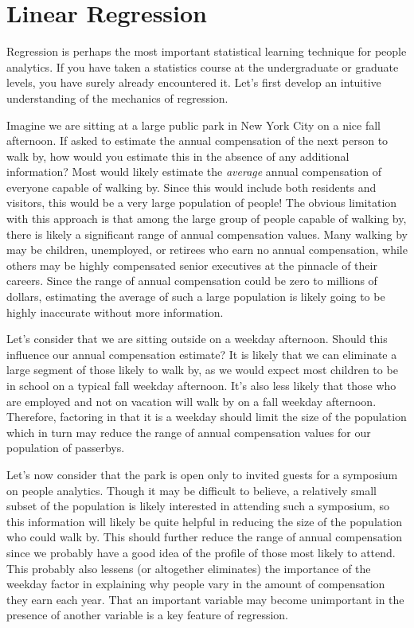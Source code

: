 \documentclass[
]{book}
\begin{document}
\hypertarget{lm}{%
\chapter{Linear Regression}\label{lm}}

Regression is perhaps the most important statistical learning technique for people analytics. If you have taken a statistics course at the undergraduate or graduate levels, you have surely already encountered it. Let's first develop an intuitive understanding of the mechanics of regression.

Imagine we are sitting at a large public park in New York City on a nice fall afternoon. If asked to estimate the annual compensation of the next person to walk by, how would you estimate this in the absence of any additional information? Most would likely estimate the \emph{average} annual compensation of everyone capable of walking by. Since this would include both residents and visitors, this would be a very large population of people! The obvious limitation with this approach is that among the large group of people capable of walking by, there is likely a significant range of annual compensation values. Many walking by may be children, unemployed, or retirees who earn no annual compensation, while others may be highly compensated senior executives at the pinnacle of their careers. Since the range of annual compensation could be zero to millions of dollars, estimating the average of such a large population is likely going to be highly inaccurate without more information.

Let's consider that we are sitting outside on a weekday afternoon. Should this influence our annual compensation estimate? It is likely that we can eliminate a large segment of those likely to walk by, as we would expect most children to be in school on a typical fall weekday afternoon. It's also less likely that those who are employed and not on vacation will walk by on a fall weekday afternoon. Therefore, factoring in that it is a weekday should limit the size of the population which in turn may reduce the range of annual compensation values for our population of passerbys.

Let's now consider that the park is open only to invited guests for a symposium on people analytics. Though it may be difficult to believe, a relatively small subset of the population is likely interested in attending such a symposium, so this information will likely be quite helpful in reducing the size of the population who could walk by. This should further reduce the range of annual compensation since we probably have a good idea of the profile of those most likely to attend. This probably also lessens (or altogether eliminates) the importance of the weekday factor in explaining why people vary in the amount of compensation they earn each year. That an important variable may become unimportant in the presence of another variable is a key feature of regression.
\end{document}
